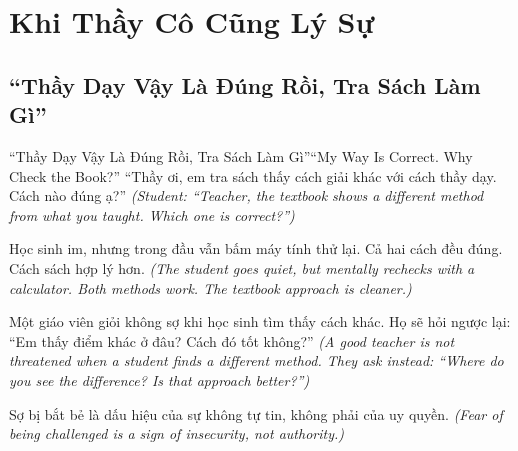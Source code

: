 

\chapter{Khi Thầy Cô Cũng Lý Sự}

\section{``Thầy Dạy Vậy Là Đúng Rồi, Tra Sách Làm Gì''}
\begin{truyen}{``Thầy Dạy Vậy Là Đúng Rồi, Tra Sách Làm Gì''}{``My Way Is Correct. Why Check the Book?''}
 ``Thầy ơi, em tra sách thấy cách giải khác với cách thầy dạy. Cách nào đúng ạ?''
\textit{(Student: ``Teacher, the textbook shows a different method from what you taught. Which one is correct?'')}


Học sinh im, nhưng trong đầu vẫn bấm máy tính thử lại. Cả hai cách đều đúng. Cách sách hợp lý hơn.
\textit{(The student goes quiet, but mentally rechecks with a calculator. Both methods work. The textbook approach is cleaner.)}

\begin{baihoc}
Một giáo viên giỏi không sợ khi học sinh tìm thấy cách khác. Họ sẽ hỏi ngược lại: ``Em thấy điểm khác ở đâu? Cách đó tốt không?''
\textit{(A good teacher is not threatened when a student finds a different method. They ask instead: ``Where do you see the difference? Is that approach better?'')}

Sợ bị bắt bẻ là dấu hiệu của sự không tự tin, không phải của uy quyền.
\textit{(Fear of being challenged is a sign of insecurity, not authority.)}
\end{baihoc}
\end{truyen}

